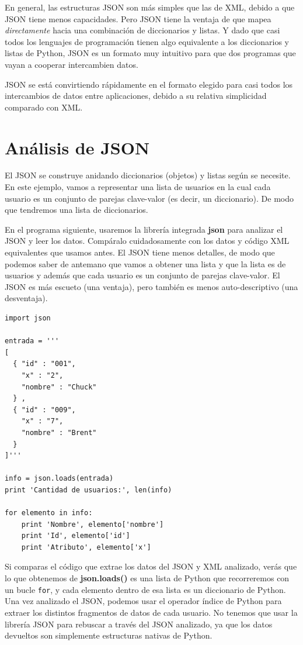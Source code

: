 En general, las estructuras JSON son más simples que las de XML, debido a que JSON tiene
menos capacidades. Pero JSON tiene la ventaja de que mapea {\em directamente} hacia una
combinación de diccionarios y listas. Y dado que casi todos los lenguajes de programación
tienen algo equivalente a los diccionarios y listas de Python, JSON es un formato
muy intuitivo para que dos programas que vayan a cooperar intercambien datos.

JSON se está convirtiendo rápidamente en el formato elegido para casi todos los intercambios
de datos entre aplicaciones, debido a su relativa simplicidad comparado con XML.

\section{Análisis de JSON}

El JSON se construye anidando diccionarios (objetos) y listas según se necesite.
En este ejemplo, vamos a representar una lista de usuarios en la cual cada usuario es un
conjunto de parejas clave-valor (es decir, un diccionario). De modo que tendremos una lista
de diccionarios.

En el programa siguiente, usaremos la librería integrada {\bf json} para analizar
el JSON y leer los datos. Compáralo cuidadosamente con los datos y código XML
equivalentes que usamos antes. El JSON tiene menos detalles, de modo que podemos saber de
antemano que vamos a obtener una lista y que la lista es de usuarios y además que cada usuario es un
conjunto de parejas clave-valor. El JSON es más escueto (una ventaja), pero también es
menos auto-descriptivo (una desventaja).

\beforeverb
\begin{verbatim}
import json

entrada = '''
[
  { "id" : "001",
    "x" : "2",
    "nombre" : "Chuck"
  } ,
  { "id" : "009",
    "x" : "7",
    "nombre" : "Brent"
  } 
]'''

info = json.loads(entrada)
print 'Cantidad de usuarios:', len(info)

for elemento in info:
    print 'Nombre', elemento['nombre']
    print 'Id', elemento['id']
    print 'Atributo', elemento['x']
\end{verbatim}
\afterverb
%
Si comparas el código que extrae los datos del JSON y XML analizado,
verás que lo que obtenemos de {\bf json.loads()} es una lista de Python
que recorreremos con un bucle {\tt for}, y cada elemento dentro de esa lista
es un diccionario de Python. Una vez analizado el JSON, podemos usar el operador
índice de Python para extraer los distintos fragmentos de datos de cada usuario. No
tenemos que usar la librería JSON para rebuscar a través del JSON analizado, ya que los
datos devueltos son simplemente estructuras nativas de Python.

